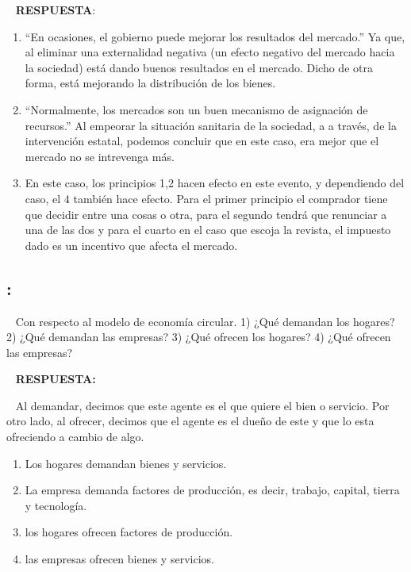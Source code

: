 \documentclass[
  letterpaper,
  DIV=11,
  numbers=noendperiod]{scrreport}
\providecommand{\tightlist}{%
  \setlength{\itemsep}{0pt}\setlength{\parskip}{0pt}}\usepackage{longtable,booktabs,array}
\begin{document}
~ \textbf{RESPUESTA}:

\begin{enumerate}
\def\labelenumi{\arabic{enumi})}
\tightlist
\item
  ``En ocasiones, el gobierno puede mejorar los resultados del
  mercado.'' Ya que, al eliminar una externalidad negativa (un efecto
  negativo del mercado hacia la sociedad) está dando buenos resultados
  en el mercado. Dicho de otra forma, está mejorando la distribución de
  los bienes.
\item
  ``Normalmente, los mercados son un buen mecanismo de asignación de
  recursos.'' Al empeorar la situación sanitaria de la sociedad, a a
  través, de la intervención estatal, podemos concluir que en este caso,
  era mejor que el mercado no se intrevenga más.
\item
  En este caso, los principios 1,2 hacen efecto en este evento, y
  dependiendo del caso, el 4 también hace efecto. Para el primer
  principio el comprador tiene que decidir entre una cosas o otra, para
  el segundo tendrá que renunciar a una de las dos y para el cuarto en
  el caso que escoja la revista, el impuesto dado es un incentivo que
  afecta el mercado.
\end{enumerate}

\hypertarget{section-22}{%
\subsection{:}\label{section-22}}

~ Con respecto al modelo de economía circular. 1) ¿Qué demandan los
hogares? 2) ¿Qué demandan las empresas? 3) ¿Qué ofrecen los hogares? 4)
¿Qué ofrecen las empresas?

~ \textbf{RESPUESTA:}

~ Al demandar, decimos que este agente es el que quiere el bien o
servicio. Por otro lado, al ofrecer, decimos que el agente es el dueño
de este y que lo esta ofreciendo a cambio de algo.

\begin{enumerate}
\def\labelenumi{\arabic{enumi})}
\tightlist
\item
  Los hogares demandan bienes y servicios.
\item
  La empresa demanda factores de producción, es decir, trabajo, capital,
  tierra y tecnología.
\item
  los hogares ofrecen factores de producción.
\item
  las empresas ofrecen bienes y servicios.
\end{enumerate}
\end{document}
